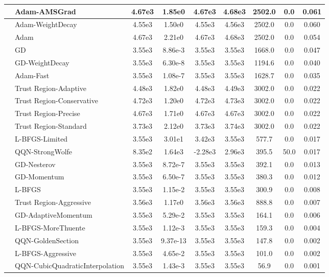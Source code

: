 \documentclass[10pt]{article}
\begin{document}
\begin{longtable}{|l|l|c|c|c|c|c|c|c|}
\hline
 & Adam-AMSGrad & 4.67e3 & 1.85e0 & 4.67e3 & 4.68e3 & 2502.0 & 0.0 & 0.061 \\
\hline
 & Adam-WeightDecay & 4.55e3 & 1.50e0 & 4.55e3 & 4.56e3 & 2502.0 & 0.0 & 0.060 \\
\hline
 & Adam & 4.67e3 & 2.21e0 & 4.67e3 & 4.68e3 & 2502.0 & 0.0 & 0.054 \\
\hline
 & GD & 3.55e3 & 8.86e-3 & 3.55e3 & 3.55e3 & 1668.0 & 0.0 & 0.047 \\
\hline
 & GD-WeightDecay & 3.55e3 & 6.30e-8 & 3.55e3 & 3.55e3 & 1194.6 & 0.0 & 0.040 \\
\hline
 & Adam-Fast & 3.55e3 & 1.08e-7 & 3.55e3 & 3.55e3 & 1628.7 & 0.0 & 0.035 \\
\hline
 & Trust Region-Adaptive & 4.48e3 & 1.82e0 & 4.48e3 & 4.49e3 & 3002.0 & 0.0 & 0.022 \\
\hline
 & Trust Region-Conservative & 4.72e3 & 1.20e0 & 4.72e3 & 4.73e3 & 3002.0 & 0.0 & 0.022 \\
\hline
 & Trust Region-Precise & 4.67e3 & 1.71e0 & 4.67e3 & 4.67e3 & 3002.0 & 0.0 & 0.022 \\
\hline
 & Trust Region-Standard & 3.73e3 & 2.12e0 & 3.73e3 & 3.74e3 & 3002.0 & 0.0 & 0.022 \\
\hline
 & L-BFGS-Limited & 3.55e3 & 3.01e1 & 3.42e3 & 3.55e3 & 577.7 & 0.0 & 0.017 \\
\hline
 & QQN-StrongWolfe & 8.35e2 & 1.64e3 & -2.28e3 & 2.96e3 & 395.5 & 50.0 & 0.017 \\
\hline
 & GD-Nesterov & 3.55e3 & 8.72e-7 & 3.55e3 & 3.55e3 & 392.1 & 0.0 & 0.013 \\
\hline
 & GD-Momentum & 3.55e3 & 6.50e-7 & 3.55e3 & 3.55e3 & 380.3 & 0.0 & 0.012 \\
\hline
 & L-BFGS & 3.55e3 & 1.15e-2 & 3.55e3 & 3.55e3 & 300.9 & 0.0 & 0.008 \\
\hline
 & Trust Region-Aggressive & 3.56e3 & 1.17e0 & 3.56e3 & 3.56e3 & 888.8 & 0.0 & 0.007 \\
\hline
 & GD-AdaptiveMomentum & 3.55e3 & 5.29e-2 & 3.55e3 & 3.55e3 & 164.1 & 0.0 & 0.006 \\
\hline
 & L-BFGS-MoreThuente & 3.55e3 & 1.12e-3 & 3.55e3 & 3.55e3 & 159.3 & 0.0 & 0.004 \\
\hline
 & QQN-GoldenSection & 3.55e3 & 9.37e-13 & 3.55e3 & 3.55e3 & 147.8 & 0.0 & 0.002 \\
\hline
 & L-BFGS-Aggressive & 3.55e3 & 4.65e-2 & 3.55e3 & 3.55e3 & 101.0 & 0.0 & 0.002 \\
\hline
 & QQN-CubicQuadraticInterpolation & 3.55e3 & 1.43e-3 & 3.55e3 & 3.55e3 & 56.9 & 0.0 & 0.001 \\

\end{longtable}
\end{document}
